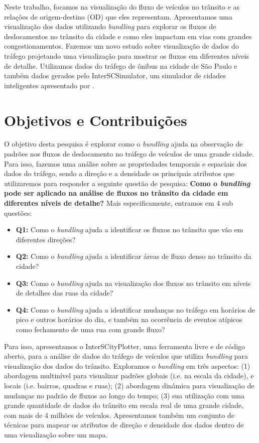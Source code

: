   Neste trabalho, focamos na visualização do fluxo de veículos no trânsito e as
relações de origem-destino (OD) que eles representam. Apresentamos uma
visualização dos dados utilizando \emph{bundling} para explorar os fluxos de
deslocamentos no trânsito da cidade e como eles impactam em vias com grandes
congestionamentos. Fazemos um novo estudo sobre visualização de dados do
tráfego projetando uma visualização para mostrar os fluxos em diferentes níveis
de detalhe. Utilizamos dados do tráfego de ônibus na cidade de São Paulo e
também dados gerados pelo InterSCSimulator, um simulador de cidades
inteligentes apresentado por \citet{mabs2017}.

\section{Objetivos e Contribuições}
  O objetivo desta pesquisa é explorar como o \emph{bundling} ajuda na
observação de padrões nos fluxos de deslocamento no tráfego de veículos de uma
grande cidade. Para isso, fazemos uma análise sobre as propriedades temporais e
espaciais dos dados do tráfego, sendo a direção e a densidade os principais
atributos que utilizaremos para responder a seguinte questão de pesquisa: \textbf{Como
o \emph{bundling} pode ser aplicado na análise de fluxos no trânsito da cidade
em diferentes níveis de detalhe?}  Mais especificamente, entramos em 4 sub questões:

\begin{itemize}
  \item \textbf{Q1:} Como o \emph{bundling}  ajuda a identificar os fluxos no trânsito
que vão em diferentes direções?

  \item \textbf{Q2:} Como o \emph{bundling}  ajuda a identificar áreas de fluxo
denso no trânsito da cidade?

  \item \textbf{Q3:} Como o \emph{bundling} ajuda na visualização dos fluxos no
trânsito em níveis de detalhes das ruas da cidade?

  \item \textbf{Q4:} Como o \emph{bundling} ajuda a identificar mudanças no
tráfego em horários de pico e outros horários do dia, e também na ocorrência de
eventos atípicos como fechamento de uma rua com grande fluxo?
\end{itemize}

 Para isso, apresentamos o InterSCityPlotter, uma ferramenta livre e de código
aberto, para a análise de dados do tráfego de veículos que utiliza
\emph{bundling} para visualização dos dados do trânsito.  Exploramos o
\emph{bundling} em três aspectos: (1) abordagem multinível para visualizar
padrões globais (i.e. na escala da cidade), e locais (i.e. bairros, quadras e
ruas); (2) abordagem dinâmica para visualização de mudanças no padrão de fluxos
ao longo do tempo; (3) sua utilização com uma grande quantidade de dados do
trânsito em escala real de uma grande cidade, com mais de 4 milhões de
veículos.  Apresentamos também um conjunto de técnicas para mapear os atributos
de direção e densidade dos dados dentro de uma visualização sobre um mapa.

